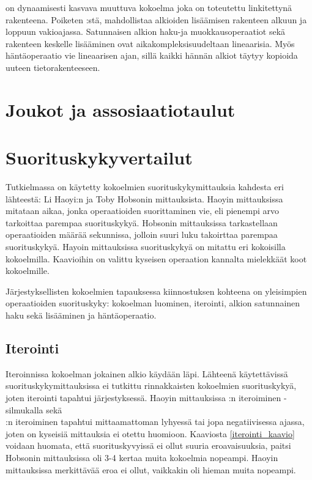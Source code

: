  on dynaamisesti kasvava muuttuva kokoelma joka on toteutettu linkitettynä rakenteena. Poiketen :stä,  mahdollistaa alkioiden lisäämisen rakenteen alkuun ja loppuun vakioajassa. Satunnaisen alkion haku-ja muokkausoperaatiot sekä rakenteen keskelle lisääminen ovat aikakompleksisuudeltaan lineaarisia. Myös häntäoperaatio vie lineaarisen ajan, sillä kaikki hännän alkiot täytyy kopioida uuteen tietorakenteeseen.   
\cite{scalaCollections}


\section{Joukot ja assosiaatiotaulut}


\section{Suorituskykyvertailut}

Tutkielmassa on käytetty kokoelmien suorituskykymittauksia kahdesta eri lähteestä: Li Haoyi:n\cite{haoyiBenchmark} ja Toby Hobsonin\cite{hobsonBenchmark} mittauksista. Haoyin mittauksissa mitataan aikaa, jonka operaatioiden suorittaminen vie, eli pienempi arvo tarkoittaa parempaa suorituskykyä. Hobsonin mittauksissa tarkastellaan operaatioiden määrää sekunnissa, jolloin suuri luku takoirttaa parempaa suorituskykyä. Hayoin mittauksissa suorituskykyä on mitattu eri kokoisilla kokoelmilla. Kaavioihin on valittu kyseisen operaation kannalta mielekkäät koot kokoelmille.

Järjestyksellisten kokoelmien tapauksessa kiinnostuksen kohteena on yleisimpien operaatioiden suorituskyky: kokoelman luominen, iterointi, alkion satunnainen haku sekä lisääminen ja häntäoperaatio. 


\subsection{Iterointi}
Iteroinnissa kokoelman jokainen alkio käydään läpi. Lähteenä käytettävissä suorituskykymittauksissa ei tutkittu rinnakkaisten kokoelmien suorituskykyä, joten iterointi tapahtui järjestyksessä. Haoyin mittauksissa :n iteroiminen -silmukalla sekä \\:n iteroiminen tapahtui mittaamattoman lyhyessä tai jopa negatiivisessa ajassa, joten on kyseisiä mittauksia ei otettu huomioon. Kaaviosta \ref{iterointi_kaavio} voidaan huomata, että suorituskyvyissä ei ollut suuria eroavaisuuksia, paitsi Hobsonin mittauksissa  oli 3-4 kertaa muita kokoelmia nopeampi. Haoyin mittauksissa merkittävää eroa ei ollut, vaikkakin  oli hieman muita nopeampi.

